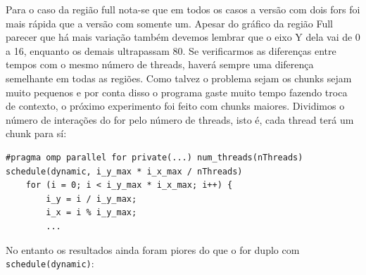 \documentclass[12pt]{article}
\newcommand{\code}[1]{\texttt{#1}}
\begin{document}
\begin{figure}[H]
\end{figure}

Para o caso da região full nota-se que em todos os casos a versão com dois fors foi mais rápida que a versão com somente um. Apesar do gráfico da região Full parecer que há mais variação também devemos lembrar que o eixo Y dela vai de 0 a 16, enquanto os demais ultrapassam 80. Se verificarmos as diferenças entre tempos com o mesmo número de threads, haverá sempre uma diferença semelhante em todas as regiões.
Como talvez o problema sejam os chunks sejam muito pequenos e por conta disso o programa gaste muito tempo fazendo troca de contexto, o próximo experimento foi feito com chunks maiores. Dividimos o número de interações do for pelo número de threads, isto é, cada thread terá um chunk para sí:
\begin{lstlisting}[style=CStyle]
    #pragma omp parallel for private(...) num_threads(nThreads) schedule(dynamic, i_y_max * i_x_max / nThreads)
    for (i = 0; i < i_y_max * i_x_max; i++) {
        i_y = i / i_y_max;
        i_x = i % i_y_max;
        ...
\end{lstlisting}

No entanto os resultados ainda foram piores do que o for duplo com \code{schedule(dynamic)}:

\begin{figure}[H]
\end{figure}
\end{document}
